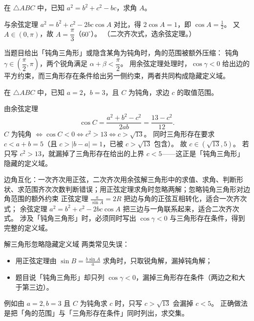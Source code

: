 \begin{explore}
\begin{example}
在 $\triangle ABC$ 中，已知 $a^2=b^2+c^2-bc$，求角 $A$。
\end{example}
\begin{solution}
与余弦定理 $a^2=b^2+c^2-2bc\cos A$ 对比，得 $2\cos A=1$，即 $\cos A=\frac12$。
又 $A\in(0,\pi)$，故 $A=\dfrac{\pi}{3}$（$60^\circ$）。
（二次齐次式，选余弦定理。）
\end{solution}

当题目给出「钝角三角形」或隐含某角为钝角时，角的范围被额外压缩：
钝角 $\gamma\in\left(\dfrac{\pi}{2},\pi\right)$，两个锐角满足 $\alpha+\beta<\dfrac{\pi}{2}$。
用余弦定理处理时，$\cos\gamma<0$ 给出边的平方约束，而三角形存在条件给出另一侧约束，两者共同构成隐藏定义域。

\begin{example}
在 $\triangle ABC$ 中，已知 $a=2$，$b=3$，且 $C$ 为钝角，求边 $c$ 的取值范围。
\end{example}
\begin{solution}
由余弦定理
\[
  \cos C=\frac{a^2+b^2-c^2}{2ab}=\frac{13-c^2}{12}.
\]
$C$ 为钝角 $\iff \cos C<0\iff c^2>13\iff c>\sqrt{13}$。
同时三角形存在要求 $c<a+b=5$（且 $c>|b-a|=1$，已被 $c>\sqrt{13}$ 包含）。
故 $c\in(\sqrt{13},5)$。
若只写 $c^2>13$，就漏掉了三角形存在给出的上界 $c<5$——这正是「钝角三角形」隐藏的定义域。
\end{solution}

\begin{conccard}[二级]{边角互化：一次齐次用正弦，二次齐次用余弦}{解三角形中的求值、求角、判断形状、求范围}{齐次次数判断错误；用正弦定理求角时忽略两解；忽略钝角三角形对边角范围的额外约束}
正弦定理 $\frac{a}{\sin A}=2R$ 把边与角的正弦互相转化，适合一次齐次式；
余弦定理 $a^2=b^2+c^2-2bc\cos A$ 把三边与一角联系起来，适合二次齐次式。
涉及「钝角三角形」时，必须同时写出 $\cos\gamma<0$ 与三角形存在条件，得到完整的定义域。
\end{conccard}

\begin{commonerror}{解三角形忽略隐藏定义域}
两类常见失误：
\begin{itemize}
  \item 用正弦定理由 $\sin B=\frac{b\sin A}{a}$ 求角时，只取锐角解，漏掉钝角解；
  \item 题目说「钝角三角形」却只列 $\cos\gamma<0$，漏掉三角形存在条件（两边之和大于第三边）。
\end{itemize}
例如由 $a=2,b=3$ 且 $C$ 为钝角求 $c$ 时，只写 $c>\sqrt{13}$ 会漏掉 $c<5$。
正确做法是把「角的范围」与「三角形存在条件」同时列出，求交集。
\end{commonerror}


\end{explore}
